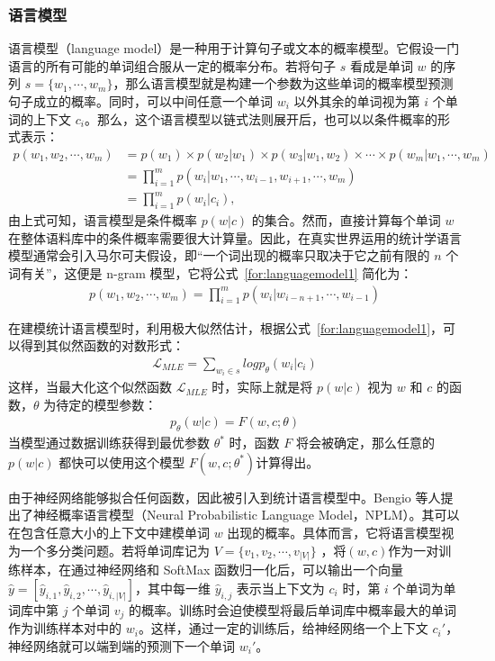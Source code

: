 \subsubsection{语言模型}
语言模型（language model）是一种用于计算句子或文本的概率模型。它假设一门语言的所有可能的单词组合服从一定的概率分布。若将句子 $s$ 看成是单词 $w$ 的序列 $s = \{w_1,\cdots, w_m\}$，那么语言模型就是构建一个参数为这些单词的概率模型预测句子成立的概率。同时，可以中间任意一个单词 $w_i$ 以外其余的单词视为第 $i$ 个单词的上下文 $c_i$。那么，这个语言模型以链式法则展开后，也可以以条件概率的形式表示：
\begin{equation}
    \begin{aligned}
        p(w_1,w_2,\cdots, w_m) &= p(w_1) \times p(w_2 | w_1) \times p(w_3 | w_1, w_2) \times \cdots \times p(w_m | w_1, \cdots, w_m) \\ 
        & = \prod_{i=1}^{m} p(w_i | w_1, \cdots, w_{i-1}, w_{i+1}, \cdots, w_m) \\
        & = \prod_{i=1}^{m} p(w_i | c_i), \label{for:languagemodel1}
    \end{aligned}
\end{equation}
由上式可知，语言模型是条件概率 $p(w|c)$ 的集合。然而，直接计算每个单词 $w$ 在整体语料库中的条件概率需要很大计算量。因此，在真实世界运用的统计学语言模型通常会引入马尔可夫假设，即“一个词出现的概率只取决于它之前有限的 $n$ 个词有关”，这便是 n-gram 模型，它将公式~\ref{for:languagemodel1} 简化为：
\begin{gather}
    p(w_1,w_2,\cdots, w_m) = \prod_{i=1}^{m} p(w_i | w_{i-n+1},\cdots,w_{i-1})
\end{gather}

在建模统计语言模型时，利用极大似然估计，根据公式~\ref{for:languagemodel1}，可以得到其似然函数的对数形式：
\begin{gather}
    \mathcal{L}_{MLE} = \sum_{w_i \in s} logp_{\theta}(w_i | c_i)
\end{gather}
这样，当最大化这个似然函数 $\mathcal{L}_{MLE}$ 时，实际上就是将 $p(w|c)$ 视为 $w$ 和 $c$ 的函数，$\theta$ 为待定的模型参数：
\begin{gather}
    p_{\theta}(w|c) = F(w,c; \theta)
\end{gather}
当模型通过数据训练获得到最优参数 $\theta^*$ 时，函数 $F$ 将会被确定，那么任意的 $p(w|c)$ 都快可以使用这个模型 $F(w,c; \theta^*)$计算得出。

由于神经网络能够拟合任何函数，因此被引入到统计语言模型中。Bengio 等人\cite{bengio_neural_2003}提出了神经概率语言模型（Neural Probabilistic Language Model，NPLM）。其可以在包含任意大小的上下文中建模单词 $w$ 出现的概率。具体而言，它将语言模型视为一个多分类问题。若将单词库记为 $V = \{v_1, v_2, \cdots, v_|V|\}$ ，将$(w,c)$作为一对训练样本，在通过神经网络和 SoftMax 函数归一化后，可以输出一个向量 $\hat{y} = [\hat{y}_{i,1},\hat{y}_{i,2},\cdots,\hat{y}_{i,|V|}]$，其中每一维 $\hat{y}_{i,j}$ 表示当上下文为 $c_i$ 时，第 $i$ 个单词为单词库中第 $j$ 个单词 $v_j$ 的概率。训练时会迫使模型将最后单词库中概率最大的单词作为训练样本对中的 $w_i$。这样，通过一定的训练后，给神经网络一个上下文 $c_i'$，神经网络就可以端到端的预测下一个单词 $w_i'$。

